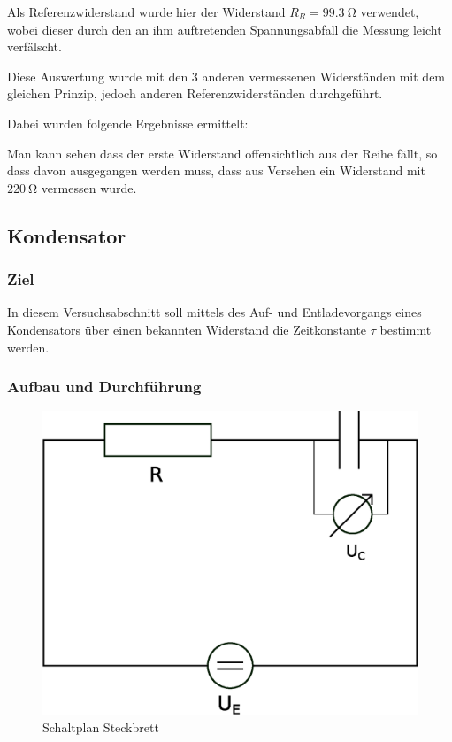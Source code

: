 \documentclass[12pt,twoside,a4paper]{scrartcl}
\begin{document}
				Als Referenzwiderstand wurde hier der Widerstand $R_R = \SI{99.3}{\ohm}$ verwendet, wobei dieser durch den an ihm auftretenden Spannungsabfall die Messung leicht verfälscht.

				Diese Auswertung wurde mit den 3 anderen vermessenen Widerständen mit dem gleichen Prinzip, jedoch anderen Referenzwiderständen durchgeführt.

				Dabei wurden folgende Ergebnisse ermittelt:

					

				Man kann sehen dass der erste Widerstand offensichtlich aus der Reihe fällt, so dass davon ausgegangen werden muss, dass aus Versehen ein Widerstand mit $\SI{220}{\ohm}$ vermessen wurde.


		\subsection{Kondensator}
			\subsubsection{Ziel}
				In diesem Versuchsabschnitt soll mittels des Auf- und Entladevorgangs eines Kondensators über einen bekannten Widerstand die Zeitkonstante $\tau$ bestimmt werden.

			\subsubsection{Aufbau und Durchführung}

			\begin{figure}[H]
				\centering

				\includegraphics[width = 0.8 \textwidth]{Pictures/capacitance}

				\caption{Schaltplan Steckbrett}
			\end{figure}
\end{document}
